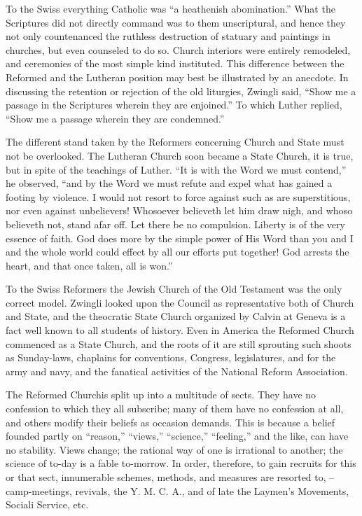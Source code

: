 \documentclass[
]{book}
\begin{document}
To the Swiss everything Catholic was ``a heathenish abomination.'' What the Scriptures did not directly command was to them unscriptural, and hence they not only countenanced the ruthless destruction of statuary and paintings in churches, but even counseled to do so. Church interiors were entirely remodeled, and ceremonies of the most simple kind instituted. This difference between the Reformed and the Lutheran position may best be illustrated by an anecdote. In discussing the retention or rejection of the old liturgies, Zwingli said, ``Show me a passage in the Scriptures wherein they are enjoined.'' To which Luther replied, ``Show me a passage wherein they are condemned.''

The different stand taken by the Reformers concerning Church and State must not be overlooked. The Lutheran Church soon became a State Church, it is true, but in spite of the teachings of Luther. ``It is with the Word we must contend,'' he observed, ``and by the Word we must refute and expel what has gained a footing by violence. I would not resort to force against such as are superstitious, nor even against unbelievers! Whosoever believeth let him draw nigh, and whoso believeth not, stand afar off. Let there be no compulsion. Liberty is of the very essence of faith. God does more by the simple power of His Word than you and I and the whole world could effect by all our efforts put together! God arrests the heart, and that once taken, all is won.''

To the Swiss Reformers the Jewish Church of the Old Testament was the only correct model. Zwingli looked upon the Council as representative both of Church and State, and the theocratic State Church organized by Calvin at Geneva is a fact well known to all students of history. Even in America the Reformed Church commenced as a State Church, and the roots of it are still sprouting such shoots as Sunday-laws, chaplains for conventions, Congress, legislatures, and for the army and navy, and the fanatical activities of the National Reform Association.

The Reformed Churchis split up into a multitude of sects. They have no confession to which they all subscribe; many of them have no confession at all, and others modify their beliefs as occasion demands. This is because a belief founded partly on ``reason,'' ``views,'' ``science,'' ``feeling,'' and the like, can have no stability. Views change; the rational way of one is irrational to another; the science of to-day is a fable to-morrow. In order, therefore, to gain recruits for this or that sect, innumerable schemes, methods, and measures are resorted to, -- camp-meetings, revivals, the Y. M. C. A., and of late the Laymen's Movements, Sociali Service, etc.
\end{document}
